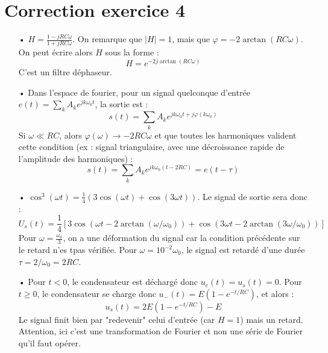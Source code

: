 \documentclass{report}
\begin{document}
\section*{Correction exercice 4}

\begin{itemize}
	\item[•]
	$H=\frac{1-jRC\omega}{1+jRC\omega}$. On remarque que $\mid H\mid=1$, mais que $\varphi=-2\arctan(RC\omega)$. On peut écrire alors $H$ sous la forme :
	\begin{equation}
		H=e^{-2j\arctan(RC\omega)}
	\end{equation}
C'est un filtre déphaseur.

	\item[•]
	Dans l'espace de fourier, pour un signal quelconque d'entrée $e(t)=\sum_k A_k e^{jk\omega_0 t}$, la sortie est :
	\begin{equation}
		s(t)=\sum_k A_k e^{jk\omega_0 t+j\varphi(k\omega_0)}
	\end{equation}
	Si $\omega\ll RC$, alors $\varphi(\omega)\longrightarrow-2RC\omega$ et que toutes les harmoniques valident cette condition (ex : signal triangulaire, avec une décroissance rapide de l'amplitude des harmoniques) :
	\begin{equation}
		s(t)=\sum_k A_k e^{jk\omega_0 (t-2RC)}=e(t-\tau)
	\end{equation}
	
	\item[•] $\cos^3(\omega t)=\frac{1}{4}(3\cos(\omega t) + \cos(3\omega t))$.
	Le signal de sortie sera donc : 
	\begin{equation}
	U_s(t) = \frac{1}{4}\left[ 3\cos(\omega t - 2\arctan(\omega/\omega_0)) + \cos(3\omega t - 2\arctan(3\omega/\omega_0))\right] 
	\end{equation}
	Pour $\omega = \frac{\omega_{0}}{3}$, on a une déformation du signal car la condition précédente sur le retard n'es tpas vérifiée. Pour $\omega=10^{-2}\omega_0$, le signal est retardé d'une durée $\tau=2/\omega_0=2RC$.
	
	\item[•] Pour $t<0$, le condensateur est déchargé donc $u_e(t)=u_s(t)=0$. Pour $t\geq0$, le condensateur se charge donc $u_-(t) = E(1-e^{-t/RC})$, et alors :
	\begin{equation}
		u_s(t)=2E(1-e^{-t/RC}) - E
	\end{equation}
	Le signal finit bien par "redevenir" celui d'entrée (car $H=1$) mais un retard. Attention, ici c'est une transformation de Fourier et non une série de Fourier qu'il faut opérer. 
	
\end{itemize}
\end{document}
